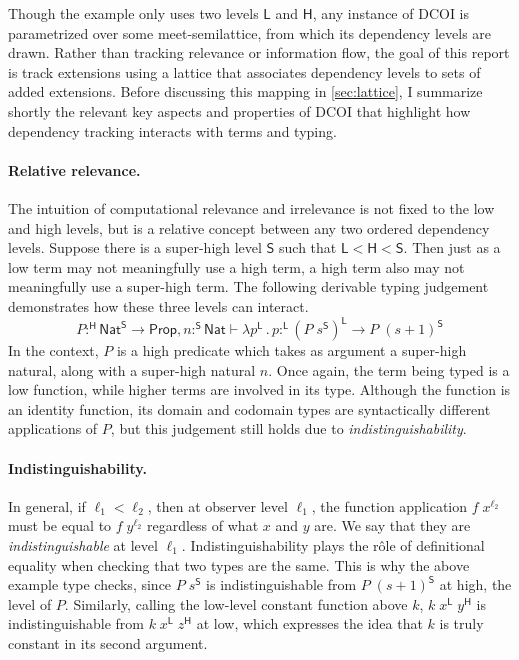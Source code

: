 \documentclass{article}
\newcommand{\kw}[1]{\mathsf{#1}}
\newcommand{\HH}{\mathsf{H}}
\newcommand{\LL}{\mathsf{L}}
\renewcommand{\SS}{\mathsf{S}}
\begin{document}
Though the example only uses two levels $\LL$ and $\HH$,
any instance of DCOI is parametrized over some meet-semilattice,
from which its dependency levels are drawn.
Rather than tracking relevance or information flow,
the goal of this report is track extensions
using a lattice that associates dependency levels to sets of added extensions.
Before discussing this mapping in \cref{sec:lattice},
I summarize shortly the relevant key aspects and properties of DCOI
that highlight how dependency tracking interacts with terms and typing.

\paragraph{Relative relevance.}
The intuition of computational relevance and irrelevance
is not fixed to the low and high levels,
but is a relative concept between any two ordered dependency levels.
Suppose there is a super-high level $\SS$ such that $\LL < \HH < \SS$.
Then just as a low term may not meaningfully use a high term,
a high term also may not meaningfully use a super-high term.
The following derivable typing judgement demonstrates
how these three levels can interact.
$$P :^\HH \kw{Nat}^\SS \to \kw{Prop}, n :^\SS \kw{Nat} \vdash \lambda p^\LL \mathpunct{.} p :^\LL
  (P \; s^\SS)^\LL \to P \; (s + 1)^\SS$$
In the context, $P$ is a high predicate which takes as argument a super-high natural,
along with a super-high natural $n$.
Once again, the term being typed is a low function,
while higher terms are involved in its type.
Although the function is an identity function,
its domain and codomain types are syntactically different applications of $P$,
but this judgement still holds due to \emph{indistinguishability}.

\paragraph{Indistinguishability.}
In general, if $\ell_1 < \ell_2$, then at observer level $\ell_1$,
the function application $f \; x^{\ell_2}$ must be equal
to $f \; y^{\ell_2}$ regardless of what $x$ and $y$ are.
We say that they are \emph{indistinguishable} at level $\ell_1$.
Indistinguishability plays the r\^ole of definitional equality
when checking that two types are the same.
This is why the above example type checks,
since $P \; s^\SS$ is indistinguishable from $P \; (s + 1)^\SS$ at high,
the level of $P$.
Similarly, calling the low-level constant function above $k$,
$k \; x^\LL \; y^\HH$ is indistinguishable from $k \; x^\LL \; z^\HH$ at low,
which expresses the idea that $k$ is truly constant in its second argument.
\end{document}
